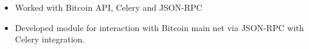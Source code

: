 \begin{itemize}
    \item Worked with Bitcoin API, Celery and JSON-RPC
    \item Developed module for interaction with Bitcoin main net via JSON-RPC with Celery integration.
\end{itemize}
